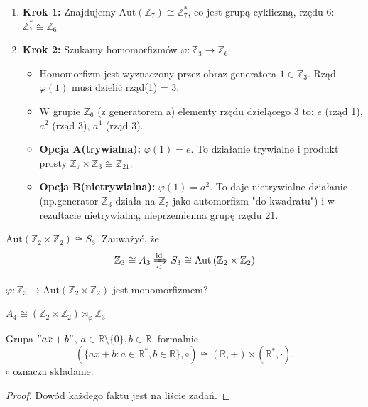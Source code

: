 \begin{remark}
\begin{enumerate}[label=\arabic*)]
\begin{itemize}
\begin{enumerate}[label=\roman*)]
					\item \textbf{Krok 1: } Znajdujemy  $\text{Aut}\left( \mathbb{Z}_7 \right) \cong \mathbb{Z}^{*}_7$, co jest grupą cykliczną, rzędu 6: $\mathbb{Z}_7^{*} \cong \mathbb{Z}_6$
					\item \textbf{Krok 2: } Szukamy homomorfizmów  $\varphi: \mathbb{Z}_3 \rightarrow \mathbb{Z}_6$
						\begin{itemize}
							\item Homomorfizm jest wyznaczony przez obraz generatora $1\in \mathbb{Z}_3$. Rząd $\varphi\left( 1 \right)$ musi dzielić rząd(1) = 3.
							\item W grupie $\mathbb{Z}_6$ (z generatorem a) elementy rzędu dzielącego 3 to: $e$ (rząd 1), $a^2 $ (rząd 3), $a^{4}$ (rząd 3).
							\item \textbf{Opcja A(trywialna): } $\varphi\left( 1 \right) = e$. To działanie trywialne i produkt prosty $\mathbb{Z}_7 \times \mathbb{Z}_3 \cong \mathbb{Z}_{21}$.
							\item \textbf{Opcja B(nietrywialna): } $\varphi\left( 1 \right) = a^2$. To daje nietrywialne działanie (np.generator $\mathbb{Z}_3$ działa na $\mathbb{Z}_7$ jako automorfizm "do kwadratu") i w rezultacie nietrywialną, nieprzemienna grupę rzędu 21. 
						\end{itemize}
				\end{enumerate}
	
		\end{itemize}
\end{enumerate}
\end{remark}

\begin{fact}

	$\text{Aut}\left( \mathbb{Z}_2\times \mathbb{Z}_2 \right) \cong S_3$.
	Zauważyć, że
	\begin{equation*}
		\mathbb{Z}_3 \cong A_3 \xRightarrow[\le ]{\operatorname{id}} S_3 \cong \text{Aut}\left( \mathbb{Z}_2\times \mathbb{Z}_2 \right) 
	\end{equation*}

	$\varphi: \mathbb{Z}_3 \rightarrow \text{Aut}\left( \mathbb{Z}_2\times \mathbb{Z}_2 \right) $ jest monomorfizmem?
\end{fact}
\begin{fact}

	$A_4 \cong \left( \mathbb{Z}_2\times \mathbb{Z}_2 \right) \rtimes_{\varphi} \mathbb{Z}_3$
\end{fact}
\begin{fact}

	Grupa $"ax+b"$,  $a\in \mathbb{R}\setminus \{0\} , b\in \mathbb{R}$, formalnie 
	\[
		\left( \{ax+b:a\in \mathbb{R}^{*},b\in \mathbb{R}\}, \circ  \right) \cong \left( \mathbb{R}, + \right) \rtimes \left( \mathbb{R}^{*}, \cdot  \right)  
	.\] 
	$\circ$ oznacza składanie.
\end{fact}
\begin{proof}

	Dowód każdego faktu jest na liście zadań.
\end{proof}

